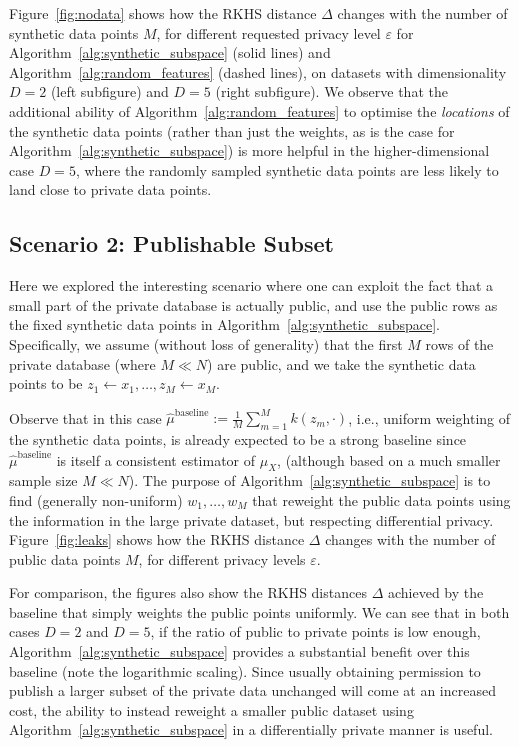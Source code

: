 Figure~\ref{fig:nodata} shows how the RKHS distance $\Delta$ changes with the number of synthetic data points $M$, for different requested privacy level $\varepsilon$ for Algorithm~\ref{alg:synthetic_subspace} (solid lines) and Algorithm~\ref{alg:random_features} (dashed lines), on datasets with dimensionality $D = 2$ (left subfigure) and $D = 5$ (right subfigure). We observe that the additional ability of Algorithm~\ref{alg:random_features} to optimise the \emph{locations} of the synthetic data points (rather than just the weights, as is the case for Algorithm~\ref{alg:synthetic_subspace}) is more helpful in the higher-dimensional case $D = 5$, where the randomly sampled synthetic data points are less likely to land close to private data points.



\subsection{Scenario 2: Publishable Subset}
\label{sec:experiments:leaks}

Here we explored the interesting scenario where one can exploit the fact that a small part of the private database is actually public, and use the public rows as the fixed synthetic data points in Algorithm~\ref{alg:synthetic_subspace}. Specifically, we assume (without loss of generality) that the first $M$ rows of the private database (where $M \ll N$) are public, and we take the synthetic data points to be $z_1 \gets x_1, \ldots, z_M \gets x_M$.

Observe that in this case $\hat{\mu}^{\text{baseline}} := \frac{1}{M} \sum_{m = 1}^M k(z_m, \cdot)$, i.e., uniform weighting of the synthetic data points, is already expected to be a strong baseline since $\hat{\mu}^{\text{baseline}}$ is itself a consistent estimator of $\mu_X$, (although based on a much smaller sample size $M \ll N$). The purpose of Algorithm~\ref{alg:synthetic_subspace} is to find (generally non-uniform) $w_1, \ldots, w_M$ that reweight the public data points using the information in the large private dataset, but respecting differential privacy. Figure~\ref{fig:leaks} shows how the RKHS distance $\Delta$ changes with the number of public data points $M$, for different privacy levels $\varepsilon$.

For comparison, the figures also show the RKHS distances $\Delta$ achieved by the baseline that simply weights the public points uniformly. We can see that in both cases $D = 2$ and $D = 5$, if the ratio of public to private points is low enough, Algorithm~\ref{alg:synthetic_subspace} provides a substantial benefit over this baseline (note the logarithmic scaling). Since usually obtaining permission to publish a larger subset of the private data unchanged will come at an increased cost, the ability to instead reweight a smaller public dataset using Algorithm~\ref{alg:synthetic_subspace} in a differentially private manner is useful.
